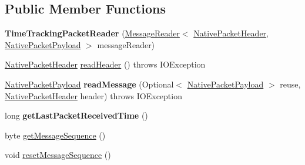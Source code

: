 \subsection*{Public Member Functions}
\begin{DoxyCompactItemize}
\item 
\mbox{\label{classcom_1_1mysql_1_1cj_1_1protocol_1_1a_1_1_time_tracking_packet_reader_a3ffbfb02e61815c12a359e0f2845766f}} 
{\bfseries Time\+Tracking\+Packet\+Reader} (\mbox{\hyperlink{interfacecom_1_1mysql_1_1cj_1_1protocol_1_1_message_reader}{Message\+Reader}}$<$ \mbox{\hyperlink{classcom_1_1mysql_1_1cj_1_1protocol_1_1a_1_1_native_packet_header}{Native\+Packet\+Header}}, \mbox{\hyperlink{classcom_1_1mysql_1_1cj_1_1protocol_1_1a_1_1_native_packet_payload}{Native\+Packet\+Payload}} $>$ message\+Reader)
\item 
\mbox{\hyperlink{classcom_1_1mysql_1_1cj_1_1protocol_1_1a_1_1_native_packet_header}{Native\+Packet\+Header}} \mbox{\hyperlink{classcom_1_1mysql_1_1cj_1_1protocol_1_1a_1_1_time_tracking_packet_reader_aa49a24bf628c8b096b222c6516cb04b3}{read\+Header}} ()  throws I\+O\+Exception 
\item 
\mbox{\label{classcom_1_1mysql_1_1cj_1_1protocol_1_1a_1_1_time_tracking_packet_reader_a6f6c10be80bf6632e4f79e17b893c539}} 
\mbox{\hyperlink{classcom_1_1mysql_1_1cj_1_1protocol_1_1a_1_1_native_packet_payload}{Native\+Packet\+Payload}} {\bfseries read\+Message} (Optional$<$ \mbox{\hyperlink{classcom_1_1mysql_1_1cj_1_1protocol_1_1a_1_1_native_packet_payload}{Native\+Packet\+Payload}} $>$ reuse, \mbox{\hyperlink{classcom_1_1mysql_1_1cj_1_1protocol_1_1a_1_1_native_packet_header}{Native\+Packet\+Header}} header)  throws I\+O\+Exception 
\item 
\mbox{\label{classcom_1_1mysql_1_1cj_1_1protocol_1_1a_1_1_time_tracking_packet_reader_a3bd1be8166c894904064c43363adb821}} 
long {\bfseries get\+Last\+Packet\+Received\+Time} ()
\item 
byte \mbox{\hyperlink{classcom_1_1mysql_1_1cj_1_1protocol_1_1a_1_1_time_tracking_packet_reader_a436548845d1e371699d0cad877dc717b}{get\+Message\+Sequence}} ()
\item 
void \mbox{\hyperlink{classcom_1_1mysql_1_1cj_1_1protocol_1_1a_1_1_time_tracking_packet_reader_a1029b1583cd042d202fa0caa956a13c2}{reset\+Message\+Sequence}} ()

\end{DoxyCompactItemize}
